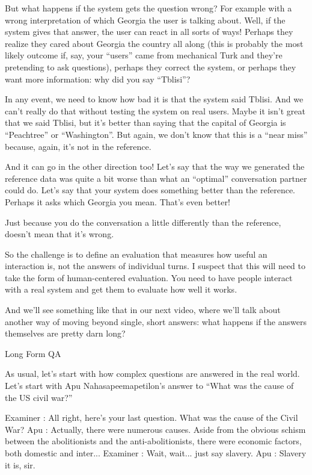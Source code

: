 But what happens if the system gets the question wrong?  For example with a wrong interpretation of which Georgia the user is talking about.  Well, if the system gives that answer, the user can react in all sorts of ways!  Perhaps they realize they cared about Georgia the country all along (this is probably the most likely outcome if, say, your “users” came from mechanical Turk and they’re pretending to ask questions), perhaps they correct the system, or perhaps they want more information: why did you say “Tblisi”?

In any event, we need to know how bad it is that the system said Tblisi.  And we can’t really do that without testing the system on real users.  Maybe it isn’t great that we said Tblisi, but it’s better than saying that the capital of Georgia is “Peachtree” or “Washington”.  But again, we don’t know that this is a “near miss” because, again, it’s not in the reference.

And it can go in the other direction too!  Let’s say that the way we generated the reference data was quite a bit worse than what an “optimal” conversation partner could do.  Let’s say that your system does something better than the reference.  Perhaps it asks which Georgia you mean.  That’s even better!

Just because you do the conversation a little differently than the reference, doesn’t mean that it’s wrong.  

So the challenge is to define an evaluation that measures how useful an interaction is, not the answers of individual turns.  I suspect that this will need to take the form of human-centered evaluation.  You need to have people interact with a real system and get them to evaluate how well it works.

And we’ll see something like that in our next video, where we’ll talk about another way of moving beyond single, short answers: what happens if the answers themselves are pretty darn long?

Long Form QA


As usual, let’s start with how complex questions are answered in the real world.  Let’s start with Apu Nahasapeemapetilon’s answer to “What was the cause of the US civil war?”

Examiner : All right, here's your last question. What was the cause of the Civil War?
Apu : Actually, there were numerous causes. Aside from the obvious schism between the abolitionists and the anti-abolitionists, there were economic factors, both domestic and inter...
Examiner : Wait, wait... just say slavery.
Apu : Slavery it is, sir.



